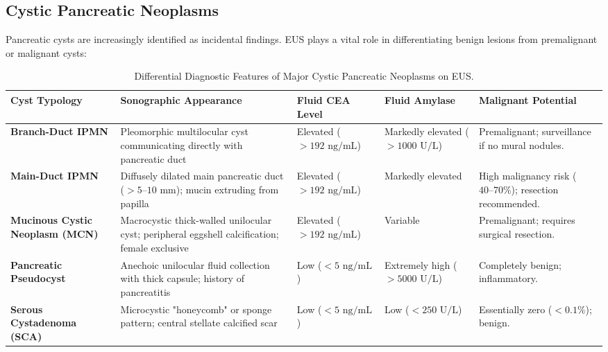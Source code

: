 \documentclass[11pt,a4paper]{article}
\begin{document}
\subsection{Cystic Pancreatic Neoplasms}
Pancreatic cysts are increasingly identified as incidental findings. EUS plays a vital role in differentiating benign lesions from premalignant or malignant cysts:

\begin{table}[htbp]
\centering
\small
\setlength{\tabcolsep}{3pt}
\caption{Differential Diagnostic Features of Major Cystic Pancreatic Neoplasms on EUS.}
\label{tab:cystic_pancreas}
\begin{tabular}{p{2.8cm} p{3.2cm} p{2.2cm} p{2.8cm} p{3.2cm}}
\toprule
\textbf{Cyst Typology} & \textbf{Sonographic Appearance} & \textbf{Fluid CEA Level} & \textbf{Fluid Amylase} & \textbf{Malignant Potential} \\
\midrule
\textbf{Branch-Duct IPMN} & Pleomorphic multilocular cyst communicating directly with pancreatic duct & Elevated ($> 192\text{ ng/mL}$) & Markedly elevated ($> 1000\text{ U/L}$) & Premalignant; surveillance if no mural nodules. \\
\addlinespace
\textbf{Main-Duct IPMN} & Diffusely dilated main pancreatic duct ($> 5\text{--}10\text{ mm}$); mucin extruding from papilla & Elevated ($> 192\text{ ng/mL}$) & Markedly elevated & High malignancy risk ($40\text{--}70\%$); resection recommended. \\
\addlinespace
\textbf{Mucinous Cystic Neoplasm (MCN)} & Macrocystic thick-walled unilocular cyst; peripheral eggshell calcification; female exclusive & Elevated ($> 192\text{ ng/mL}$) & Variable & Premalignant; requires surgical resection. \\
\addlinespace
\textbf{Pancreatic Pseudocyst} & Anechoic unilocular fluid collection with thick capsule; history of pancreatitis & Low ($< 5\text{ ng/mL}$) & Extremely high ($> 5000\text{ U/L}$) & Completely benign; inflammatory. \\
\addlinespace
\textbf{Serous Cystadenoma (SCA)} & Microcystic "honeycomb" or sponge pattern; central stellate calcified scar & Low ($< 5\text{ ng/mL}$) & Low ($< 250\text{ U/L}$) & Essentially zero ($< 0.1\%$); benign. \\
\bottomrule
\end{tabular}
\end{table}
\end{document}
